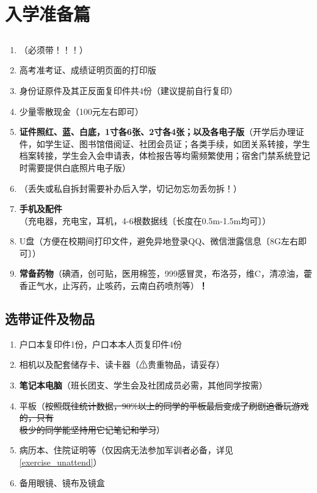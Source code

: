 \chapter[入学准备篇]{入学准备篇\vspace{-1.5em}}
\section[必要证件及物品]{}
\begin{enumerate}
    \item \textbf{}（必须带！！！）
    \item 高考准考证、成绩证明页面的打印版\footnotemark
    \item 身份证原件及其正反面复印件共4份（建议提前自行复印）
    \item 少量零散现金（100元左右即可）\footnotemark
    \item \textbf{证件照红、蓝、白底，1寸各6张、2寸各4张；以及各电子版}（开学后办理证件，如学生证、图书馆借阅证、社团会员证；各类手续，如团关系转接，学生档案转接，学生会入会申请表，体检报告等均需频繁使用；宿舍门禁系统登记时需要提供白底照片电子版）
    \item \textbf{}（丢失或私自拆封需要补办后入学，切记勿忘勿丢勿拆！）
    \item \textbf{手机及配件}（充电器，充电宝，耳机，4-6根数据线〔长度在0.5m-1.5m均可〕）
    \item U盘（方便在校期间打印文件，避免异地登录QQ、微信泄露信息〔8G左右即可〕）
    \item \textbf{常备药物}（碘酒，创可贴，医用棉签，999感冒灵，布洛芬，维C，清凉油，藿香正气水，止泻药，止咳药，云南白药喷剂等）\textbf{！}
\end{enumerate}

\section[选带证件及物品]{选带证件及物品}
\begin{enumerate}
    \item 户口本复印件1份，户口本本人页复印件4份\footnotemark
    \item 相机以及配套储存卡、读卡器（⚠贵重物品，请妥存）
    \item \textbf{笔记本电脑}（班长团支、学生会及社团成员必需，其他同学按需）
    \item 平板（\sout{按照既往统计数据，90\%以上的同学的平板最后变成了刷剧追番玩游戏的，只有\\极少的同学能坚持用它记笔记和学习}）
    \item 病历本、住院证明等（仅因病无法参加军训者必备，详见\uline{\ref{exercise_unattend}}）
    \item 备用眼镜、镜布及镜盒
\end{enumerate}

